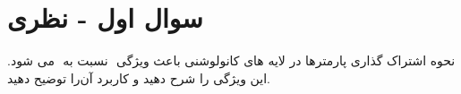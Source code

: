 \section{سوال اول - نظری}

نحوه اشتراک گذاری پارمتر‌ها  در لایه های کانولوشنی باعث ویژگی ‫‪‬‬ نسبت به ‫‪‬‬ می شود. این ویژگی را شرح دهید و کاربرد آن‌را توضیح دهید.

%
%
%
%
%	
%	
%
%	
%
%
%
%
%
%

